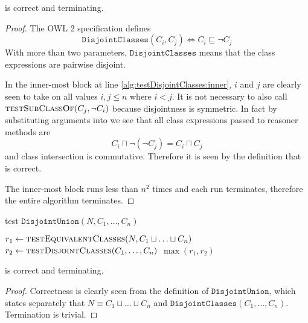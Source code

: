 \documentclass[paper.tex]{subfiles}
\begin{document}
\begin{theorem}
   is correct and terminating.
\end{theorem}
\begin{proof}
  The OWL 2 specification \cite{W3C:OWL2Syntax} defines
  \[ \mathtt{DisjointClasses}(C_i, C_j) \iff C_i \sqsubseteq \neg C_j \]
  With more than two parameters, $\mathtt{DisjointClasses}$ means that the class expressions are pairwise disjoint.

  In the inner-most block at line \ref{alg:testDisjointClasses:inner}, $i$ and $j$ are clearly seen to take on all values $i, j \le n$ where $i < j$.
  It is not necessary to also call $\Call{testSubClassOf}{C_j, \neg C_i}$ because disjointness is symmetric.  In fact by substituting arguments into  we see that all class expressions passed to reasoner methods are
  \[ C_i \sqcap \neg (\neg C_j) = C_i \sqcap C_j \]
  and class intersection is commutative.  Therefore it is seen by the definition that  is correct.  \todo[unconvincing]

  The inner-most block runs less than $n^2$ times and each run terminates, therefore the entire algorithm terminates.
\end{proof}


\begin{algorithm}[H]
  \caption{test $\mathtt{DisjointUnion}(N, C_1, \ldots, C_n)$}
  \begin{algorithmic}[1]
    \raggedright
      \State $r_1 \gets \Call{testEquivalentClasses}{N, C_1 \sqcup \ldots \sqcup C_n}$
      \State $r_2 \gets \Call{testDisjointClasses}{C_1, \ldots, C_n}$
      \State \Return $\max(r_1, r_2)$
    \EndFunction
  \end{algorithmic}
\end{algorithm}

\begin{theorem}
   is correct and terminating.
\end{theorem}
\begin{proof}
  Correctness is clearly seen from the definition of $\mathtt{DisjointUnion}$, which states separately that $N \equiv C_1 \sqcup \ldots \sqcup C_n$ and $\mathtt{DisjointClasses}(C_1, \ldots, C_n)$.  Termination is trivial.
\end{proof}
\end{document}
